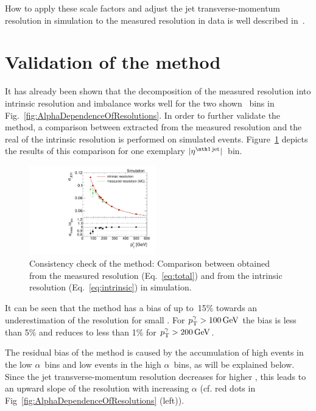 How to apply these scale factors and adjust the jet transverse-momentum resolution in simulation to the measured resolution in data is well described in~\cite{bib:Matthias_Thesis}.
\FloatBarrier
\section{Validation of the method}
\label{res:sec:validation}
It has already been shown that the decomposition of the measured resolution into intrinsic resolution and imbalance works well for the two shown \ptgamma~bins in Fig.~\ref{fig:AlphaDependenceOfResolutions}.
In order to further validate the method, a comparison between \jer extracted from the measured resolution and the real \jer of the intrinsic resolution is performed on simulated events. 
Figure~\ref{fig:MCClosure} depicts the results of this comparison for one exemplary $|\etafirstjet|$~bin.
\begin{figure}[!t]
  \centering
    \includegraphics[width=0.49\textwidth]{figures/resolution/methodology/MCClosure_for_1_eta_bin_RMS99.pdf}
  \caption{Consistency check of the method: Comparison between \jer obtained from the measured resolution (Eq.~\eqref{eq:total}) and from the intrinsic resolution (Eq.~\eqref{eq:intrinsic}) in simulation.}  
  \label{fig:MCClosure}
\end{figure}
It can be seen that the method has a bias of up to~15\% towards an underestimation of the resolution for small \ptgamma. 
For ${p}_\mathrm{T}^{\gamma}>100\,\text{Ge}\kern-0.06667em\text{V}$ the bias is less than 5\% and reduces to less than 1\% for ${p}_\mathrm{T}^{\gamma}>200\,\text{Ge}\kern-0.06667em\text{V}$.

The residual bias of the method is caused by the accumulation of high \ptfirstjet events in the low $\alpha$~bins and low \ptfirstjet events in the high $\alpha$~bins, as will be explained below.
Since the jet transverse-momentum resolution decreases for higher \ptfirstjet, this leads to an upward slope of the resolution with increasing $\alpha$ (cf. red dots in Fig~\ref{fig:AlphaDependenceOfResolutions} (left)).

